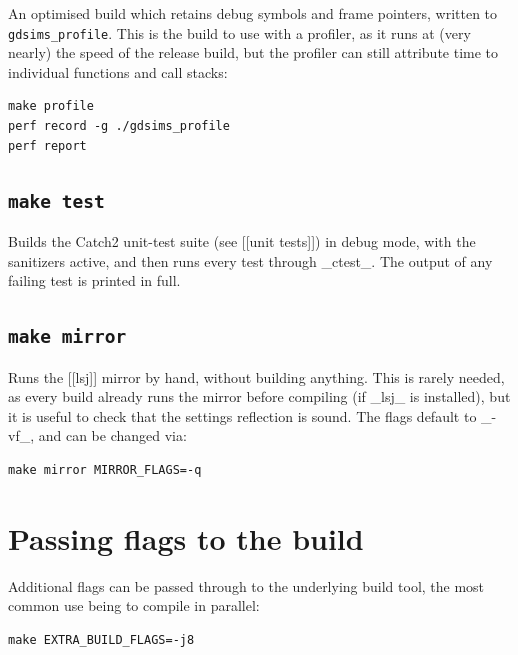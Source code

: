 		An optimised build which retains debug symbols and frame pointers, written to \texttt{gdsims\_profile}. This is the build to use with a profiler, as it runs at (very nearly) the speed of the release build, but the profiler can still attribute time to individual functions and call stacks:

		\begin{lstlisting}
make profile
perf record -g ./gdsims_profile
perf report
\end{lstlisting}

	\subsection{\tt make test}

		Builds the Catch2 unit-test suite (see [[unit tests]]) in debug mode, with the sanitizers active, and then runs every test through _ctest_. The output of any failing test is printed in full.

	\subsection{\tt make mirror}

		Runs the [[lsj]] mirror by hand, without building anything. This is rarely needed, as every build already runs the mirror before compiling (if _lsj_ is installed), but it is useful to check that the settings reflection is sound. The flags default to _-vf_, and can be changed via:

		\begin{lstlisting}
make mirror MIRROR_FLAGS=-q
\end{lstlisting}


\section{Passing flags to the build}

	Additional flags can be passed through to the underlying build tool, the most common use being to compile in parallel:

	\begin{lstlisting}
make EXTRA_BUILD_FLAGS=-j8
\end{lstlisting}
